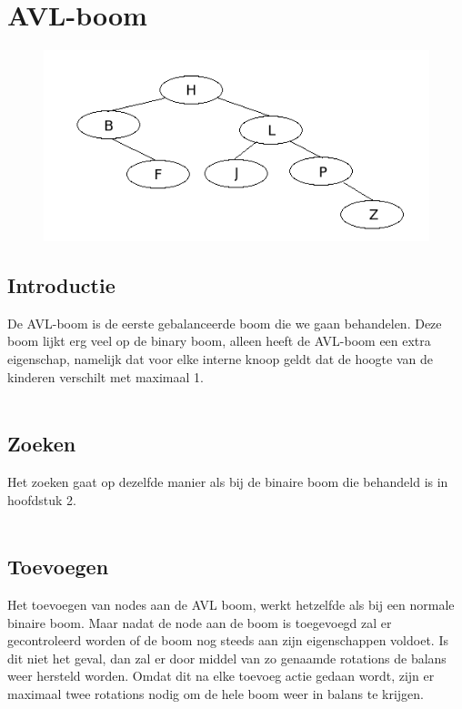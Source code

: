 \chapter{AVL-boom}
\label{sec:Hoofdstuk 4}

\begin{figure}[h]
	\centering
		\includegraphics[width=\textwidth]{chap4/avltree}
	\label{fig:avltree}
\end{figure}

\section{Introductie}
De AVL-boom is de eerste gebalanceerde boom die we gaan behandelen. Deze boom lijkt erg veel op de binary boom, alleen heeft de AVL-boom een extra eigenschap, namelijk dat voor elke interne knoop geldt dat de hoogte van de kinderen verschilt met maximaal 1.\\
\\
\section{Zoeken}
Het zoeken gaat op dezelfde manier als bij de binaire boom die behandeld is in hoofdstuk 2.\\
\\
\section{Toevoegen}
Het toevoegen van nodes aan de AVL boom, werkt hetzelfde als bij een normale binaire boom. Maar nadat de node aan de boom is toegevoegd zal er gecontroleerd worden of de boom nog steeds aan zijn eigenschappen voldoet. Is dit niet het geval, dan zal er door middel van zo genaamde rotations de balans weer hersteld worden. Omdat dit na elke toevoeg actie gedaan wordt, zijn er maximaal twee rotations nodig om de hele boom weer in balans te krijgen.

